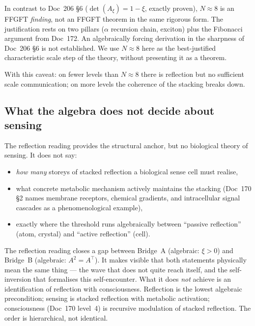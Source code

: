 \begin{important}
In contrast to Doc~206 \S6 ($\det(A_\xi) = 1-\xi$, exactly proven), $N \approx 8$ is an FFGFT \emph{finding}, not an FFGFT theorem in the same rigorous form. The justification rests on two pillars ($\alpha$ recursion chain, exciton) plus the Fibonacci argument from Doc~172. An algebraically forcing derivation in the sharpness of Doc~206 \S6 is not established. We use $N \approx 8$ here as the best-justified characteristic scale step of the theory, without presenting it as a theorem.
\end{important}

With this caveat: on fewer levels than $N \approx 8$ there is reflection but no sufficient scale communication; on more levels the coherence of the stacking breaks down.

\subsection{What the algebra does not decide about sensing}\label{sec:reflection_limit}

The reflection reading provides the structural anchor, but no biological theory of sensing. It does not say:

\begin{itemize}
\item \emph{how many} storeys of stacked reflection a biological sense cell must realise,
\item what concrete metabolic mechanism actively maintains the stacking (Doc~170 \S2 names membrane receptors, chemical gradients, and intracellular signal cascades as a phenomenological example),
\item exactly where the threshold runs algebraically between ``passive reflection'' (atom, crystal) and ``active reflection'' (cell).
\end{itemize}

\begin{interpretation}
The reflection reading closes a gap between Bridge~A (algebraic: $\xi > 0$) and Bridge~B (algebraic: $A^2 = A^\top$). It makes visible that both statements physically mean the same thing --- the wave that does not quite reach itself, and the self-inversion that formalises this self-encounter. What it does \emph{not} achieve is an identification of reflection with consciousness. Reflection is the lowest algebraic precondition; sensing is stacked reflection with metabolic activation; consciousness (Doc~170 level~4) is recursive modulation of stacked reflection. The order is hierarchical, not identical.
\end{interpretation}

